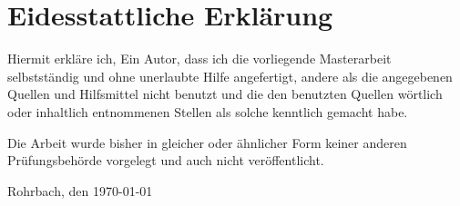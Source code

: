 \newpage
\chapter*{Eidesstattliche Erklärung}

Hiermit erkläre ich, Ein Autor, dass ich die vorliegende Masterarbeit selbstständig und ohne unerlaubte Hilfe angefertigt, andere als die angegebenen Quellen und Hilfsmittel nicht benutzt und die den benutzten Quellen wörtlich oder inhaltlich entnommenen Stellen als solche kenntlich gemacht habe.

Die Arbeit wurde bisher in gleicher oder ähnlicher Form keiner anderen Prüfungsbehörde vorgelegt und auch nicht veröffentlicht.
\vspace{1cm}

\hfill Rohrbach, den \today \hrulefill